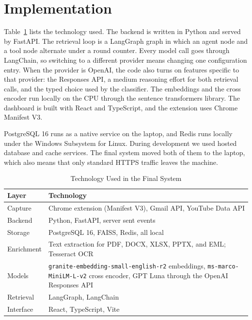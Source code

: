 \documentclass[conference]{IEEEtran}
\newcommand{\embmodel}{\texttt{granite\allowbreak-embedding\allowbreak-small\allowbreak-english\allowbreak-r2}}
\newcommand{\rerankmodel}{\texttt{ms\allowbreak-marco\allowbreak-MiniLM\allowbreak-L\allowbreak-6\allowbreak-v2}}
\newcommand{\llmname}{GPT\nobreakdash-5.6 Luna}
\begin{document}
\section{Implementation}\label{sec:impl}
Table~\ref{tab:stack} lists the technology used. The backend is written in Python and served by FastAPI. The retrieval loop is a LangGraph graph \cite{b5} in which an agent node and a tool node alternate under a round counter. Every model call goes through LangChain, so switching to a different provider means changing one configuration entry. When the provider is OpenAI, the code also turns on features specific to that provider: the Responses API, a medium reasoning effort for both retrieval calls, and the typed choice used by the classifier. The embeddings and the cross encoder run locally on the CPU through the sentence transformers library. The dashboard is built with React and TypeScript, and the extension uses Chrome Manifest V3.

PostgreSQL 16 runs as a native service on the laptop, and Redis runs locally under the Windows Subsystem for Linux. During development we used hosted database and cache services. The final system moved both of them to the laptop, which also means that only standard HTTPS traffic leaves the machine.

\begin{table}[t]
\caption{Technology Used in the Final System}
\label{tab:stack}
\centering
\renewcommand{\arraystretch}{1.15}
\begin{tabular}{|>{\raggedright\arraybackslash}p{2.0cm}|>{\raggedright\arraybackslash}p{5.55cm}|}
\hline
\textbf{Layer} & \textbf{Technology} \\
\hline
Capture & Chrome extension (Manifest V3), Gmail API, YouTube Data API \\
\hline
Backend & Python, FastAPI, server sent events \\
\hline
Storage & PostgreSQL 16, FAISS, Redis, all local \\
\hline
Enrichment & Text extraction for PDF, DOCX, XLSX, PPTX, and EML; Tesseract OCR \\
\hline
Models & \embmodel{} embeddings, \rerankmodel{} cross encoder, \llmname{} through the OpenAI Responses API \\
\hline
Retrieval & LangGraph, LangChain \\
\hline
Interface & React, TypeScript, Vite \\
\hline
\end{tabular}
\end{table}
\end{document}
